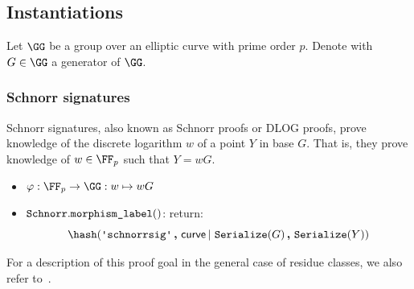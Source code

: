 \documentclass[11pt]{article}
\begin{document}
\subsection{Instantiations}\label{sec:instantiations}
Let $\GG$ be a group over an elliptic curve with prime order $p$. Denote with $G \in \GG$ a generator of $\GG$.

\subsubsection{Schnorr signatures}\label{sec:instantiations:schnorr}
Schnorr signatures, also known as Schnorr proofs or DLOG proofs, prove knowledge of the discrete logarithm $w$ of a point $Y$ in base $G$.
That is, they prove knowledge of $w\in\FF_p$ such that $Y=wG$.

\begin{itemize}
  \item $\varphi:\FF_p\to\GG:w\mapsto wG$
  \item $\texttt{Schnorr}.\texttt{morphism\_label}()$: return:
  \[
    \hash(\schnorrlabel \concat \curvectx \concatblock \serialize(G) \concat \serialize(\statement))
  \]
\end{itemize}

For a description of this proof goal in the general case of residue classes, we also refer to~\cite[1.4.1]{zkproof-reference}.

\end{document}
